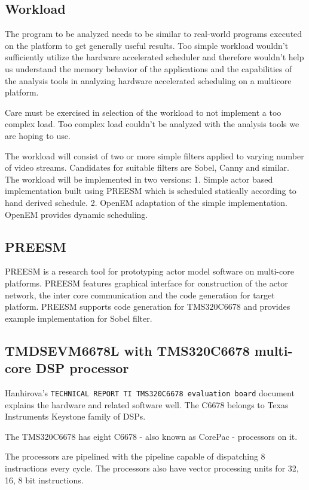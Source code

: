\subsection{Workload}
The program to be analyzed needs to be similar to real-world programs executed on the platform to get generally useful results. Too simple workload wouldn't sufficiently utilize the hardware accelerated scheduler and therefore wouldn't help us understand the memory behavior of the applications and the capabilities of the analysis tools in analyzing hardware accelerated scheduling on a multicore platform.

Care must be exercised in selection of the workload to not implement a too complex load. Too complex load couldn't be analyzed with the analysis tools we are hoping to use.

The workload will consist of two or more simple filters applied to varying number of video streams. Candidates for suitable filters are Sobel, Canny and similar. The workload will be implemented in two versions: 1. Simple actor based implementation built using PREESM which is scheduled statically according to hand derived schedule. 2. OpenEM adaptation of the simple implementation. OpenEM provides dynamic scheduling.

\subsection{PREESM}
PREESM is a research tool for prototyping actor model software on multi-core platforms. PREESM features graphical interface for construction of the actor network, the inter core communication and the code generation for target platform. PREESM supports code generation for TMS320C6678 and provides example implementation for Sobel filter.

\subsection{TMDSEVM6678L with TMS320C6678 multi-core DSP processor}
Hanhirova's {\tt TECHNICAL REPORT TI TMS320C6678 evaluation board} document explains the hardware and related software well. The C6678 belongs to Texas Instruments Keystone family of DSPs.

The TMS320C6678 has eight C6678 - also known as CorePac - processors on it.

The processors are pipelined with the pipeline capable of dispatching 8 instructions every cycle. The processors also have vector processing units for 32, 16, 8 bit instructions.

